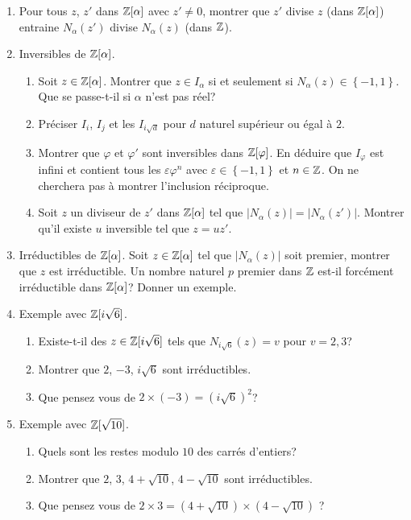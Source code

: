 \begin{enumerate}
  \item Pour tous $z$, $z'$ dans $\mathbb{Z}[\alpha]$ avec $z'\neq 0$, montrer que $z'$ divise $z$ (dans $\mathbb{Z}[\alpha]$) entraine $N_{\alpha}(z')$ divise $N_{\alpha}(z)$ (dans $\mathbb{Z}$).
  \item Inversibles de $\mathbb{Z}[\alpha]$.
  \begin{enumerate}
    \item Soit $z\in \mathbb{Z}[\alpha]$. Montrer que $z\in I_\alpha$ si et seulement si $N_\alpha(z) \in \left\lbrace -1, 1\right\rbrace$. Que se passe-t-il si $\alpha$ n'est pas réel?
    \item Préciser $I_i$, $I_j$ et les $I_{i\sqrt{d}}$ pour $d$ naturel supérieur ou égal à $2$.
    \item Montrer que $\varphi$ et $\varphi'$ sont inversibles dans $\mathbb{Z}[\varphi]$. En déduire que $I_\varphi$ est infini et contient tous les $\varepsilon \varphi^n$ avec $\varepsilon \in \left\lbrace -1, 1\right\rbrace$ et $n\in \mathbb{Z}$. On ne cherchera pas à montrer l'inclusion réciproque. 
    \item Soit $z$ un diviseur de $z'$ dans $\mathbb{Z}[\alpha]$ tel que $|N_{\alpha}(z)|=|N_{\alpha}(z')|$. Montrer qu'il existe $u$ inversible tel que $z=uz'$. 
  \end{enumerate}
  
  \item Irréductibles de $\mathbb{Z}[\alpha]$.\newline
  Soit $z\in \mathbb{Z}[\alpha]$ tel que $|N_{\alpha}(z)|$ soit premier, montrer que $z$ est irréductible. Un nombre naturel $p$ premier dans $\mathbb{Z}$ est-il forcément irréductible dans $\mathbb{Z}[\alpha]$? Donner un exemple.
  \item Exemple avec $\mathbb{Z}[i\sqrt{6}]$.
  \begin{enumerate}
    \item Existe-t-il des $z\in \mathbb{Z}[i\sqrt{6}]$ tels que $N_{i\sqrt{6}}(z)=v$ pour $v = 2,3$?
    \item Montrer que $2$, $-3$, $i\sqrt{6}$ sont irréductibles.
    \item Que pensez vous de $2 \times (-3) = (i\sqrt{6})^2$? 
  \end{enumerate}
  
  \item Exemple avec $\mathbb{Z}[\sqrt{10}]$.
  \begin{enumerate}
    \item Quels sont les restes modulo $10$ des carrés d'entiers?
    \item Montrer que $2$, $3$, $4+\sqrt{10}$, $4-\sqrt{10}$ sont irréductibles.
    \item Que pensez vous de $2\times 3 = (4+\sqrt{10}) \times (4-\sqrt{10})$ ?
  \end{enumerate}

\end{enumerate}

